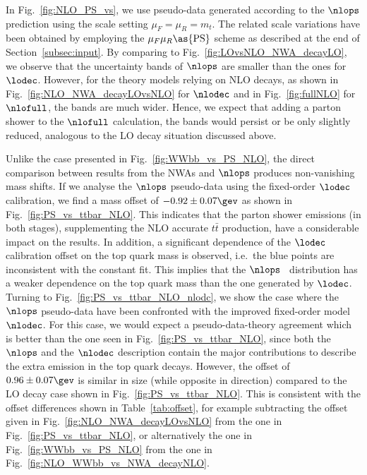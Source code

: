In Fig.~\ref{fig:NLO_PS_vs}, 
we use pseudo-data generated according to the $\nlops$ prediction
using the scale setting $\mu_F=\mu_R=m_t$. The related
scale variations have been obtained by employing the
$\mu_F\mu_R\as{\mathrm{PS}}$ scheme as described at the end of
Section~\ref{subsec:input}. 
By comparing to Fig.~\ref{fig:LOvsNLO_NWA_decayLO}, 
we observe that the uncertainty bands of $\nlops$ are smaller than the
ones for $\lodec$. However, for the theory models relying on NLO decays,
as shown in Fig.~\ref{fig:NLO_NWA_decayLOvsNLO} for $\nlodec$
and in Fig.~\ref{fig:fullNLO} for $\nlofull$, the bands are much wider.
Hence, we expect that adding a parton shower to the $\nlofull$
calculation, the bands would persist or be only slightly reduced,
analogous to the LO decay situation discussed above.

Unlike the case presented in Fig.~\ref{fig:WWbb_vs_PS_NLO}, the direct
comparison between results from the NWAs and $\nlops$ produces
non-vanishing mass shifts.
If we analyse the $\nlops$ pseudo-data using the
fixed-order $\lodec$ calibration, we find a mass offset of
$-0.92\pm0.07\gev$ as shown in Fig.~\ref{fig:PS_vs_ttbar_NLO}. This
indicates that the parton shower emissions (in both stages),
supplementing the NLO accurate $t\bar t$ production, have a
considerable impact on the results.
%
In addition, a significant dependence of the $\lodec$ calibration offset
on the top quark mass is observed,
i.e.~the blue points are inconsistent with the constant fit.
%
This implies that the $\nlops$ \mlb\ distribution has a weaker
dependence on the top quark mass than the one generated by $\lodec$.
%
Turning to Fig.~\ref{fig:PS_vs_ttbar_NLO_nlodc}, we show the case
where the $\nlops$ pseudo-data have been confronted with the
improved fixed-order model $\nlodec$. For this case, we would expect a
pseudo-data-theory agreement which is better than the one seen in
Fig.~\ref{fig:PS_vs_ttbar_NLO}, since
both the $\nlops$ and the $\nlodec$ description contain the major
contributions to describe the extra emission in the top quark decays.
However, the offset of
$0.96\pm0.07\gev$ is similar in size (while opposite in direction)
compared to the LO decay case shown in Fig.~\ref{fig:PS_vs_ttbar_NLO}.
This is consistent with the offset differences shown in Table~\ref{tab:offset}, 
for example subtracting the offset given in Fig.~\ref{fig:NLO_NWA_decayLOvsNLO}
 from the one in Fig.~\ref{fig:PS_vs_ttbar_NLO}, 
or alternatively the one in Fig.~\ref{fig:WWbb_vs_PS_NLO} from the one
in Fig.~\ref{fig:NLO_WWbb_vs_NWA_decayNLO}.

